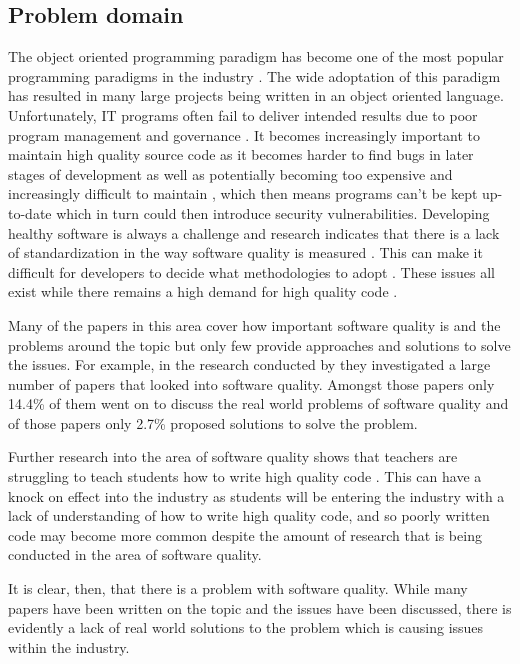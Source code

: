\subsection{Problem domain}

The object oriented programming paradigm has become one of the most popular programming paradigms in the industry \citep{6606742}. The wide adoptation of this paradigm has resulted in many large projects being written in an object oriented language.
Unfortunately, IT programs often fail to deliver intended results due to poor program management and governance \citep{7372958}. It becomes increasingly important to maintain high quality source code as it becomes harder to find bugs in later stages of development \citep{8681007} as well as potentially becoming too expensive and increasingly difficult to maintain \citep{8802820, 10.1145/2507288.2507312, 10.1145/3379597.3387457, 6606742, 7372958}, which then means programs can't be kept up-to-date which in turn could then introduce security vulnerabilities.
Developing healthy software is always a challenge \citep{8681007} and research indicates that there is a lack of standardization in the way software quality is measured \citep{6606742, 8681007}. This can make it difficult for developers to decide what methodologies to adopt \citep{6606742}. These issues all exist while there remains a high demand for high quality code \citep{6606742}.

Many of the papers in this area cover how important software quality is and the problems around the topic but only few provide approaches and solutions to solve the issues. For example, in the research conducted by \cite{6606742} they investigated a large number of papers that looked into software quality. Amongst those papers only 14.4\% of them went on to discuss the real world problems of software quality and of those papers only 2.7\% proposed solutions to solve the problem.

Further research into the area of software quality shows that teachers are struggling to teach students how to write high quality code \citep{10.1145/3428029.3428047}. This can have a knock on effect into the industry as students will be entering the industry with a lack of understanding of how to write high quality code, and so poorly written code may become more common despite the amount of research that is being conducted in the area of software quality.

It is clear, then, that there is a problem with software quality. While many papers have been written on the topic and the issues have been discussed, there is evidently a lack of real world solutions to the problem which is causing issues within the industry.

